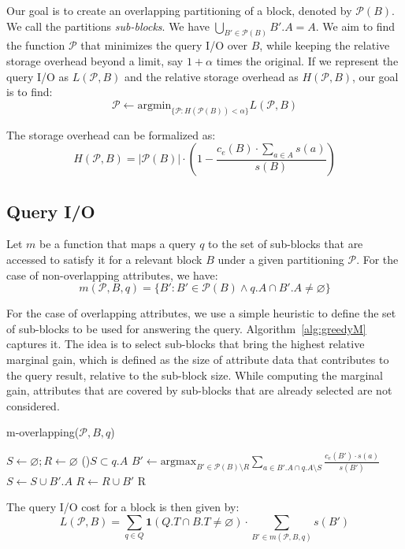 \documentclass[twocolumn]{svjour3}          %
\let\emptyset\varnothing
\begin{document}
Our goal is to create an overlapping partitioning of a block, denoted by
$\mathcal{P}(B)$. We call the partitions \emph{sub-blocks}. We have
$\bigcup_{B'\in \mathcal{P}(B)} B'.A = A$. We aim to find the function
$\mathcal{P}$ that minimizes the query I/O over $B$, while keeping the
relative storage overhead beyond a limit, say $1+\alpha$ times the original.
If we represent the query I/O as $L(\mathcal{P}, B)$ and the relative storage
overhead as $H(\mathcal{P}, B)$, our goal is to find:
\begin{equation}
\mathcal{P} \leftarrow \mbox{argmin}_{\{\mathcal{P}: H(\mathcal{P}(B)) < \alpha\}} L(\mathcal{P},B)
\end{equation}

The storage overhead can be formalized as:
\begin{equation}
H(\mathcal{P}, B) = |\mathcal{P}(B)|\cdot\left(1-\frac{c_e(B)\cdot \sum_{a\in A} s(a)}{s(B)}\right) 
\end{equation}

\subsection{Query I/O}

Let $m$ be a function that maps a query $q$ to the set of sub-blocks that are
accessed to satisfy it for a relevant block $B$ under a given partitioning
$\mathcal{P}$. For the case of non-overlapping attributes, we have:
\begin{equation}
m(\mathcal{P}, B, q) = \{B': B'\in \mathcal{P}(B) \wedge q.A \cap B'.A \ne \emptyset\}  
\end{equation}

For the case of overlapping attributes, we use a simple heuristic to define the
set of sub-blocks to be used for answering the query.
Algorithm~\ref{alg:greedyM} captures it. The idea is to select sub-blocks that
bring the highest relative marginal gain, which is defined as the size of
attribute data that contributes to the query result, relative to the sub-block
size. While computing the marginal gain, attributes that are covered by
sub-blocks that are already selected are not considered.
%
\begin{algorithm}[h]
\scriptsize
\caption{m-overlapping($\mathcal{P}, B, q$)}
\label{alg:greedyM}
$S\leftarrow \emptyset; R\leftarrow \emptyset$ 
\While(){$S \subset q.A$}{
  $B' \leftarrow \mbox{argmax}_{B'\in\mathcal{P}(B)\setminus R} \sum_{a\in B'.A \cap q.A \setminus S} \frac{c_e(B') \cdot s(a)}{s(B')}$
  $S \leftarrow S \cup B'.A$
  $R\leftarrow R \cup B'$
}
\Return R 
\end{algorithm} 
%
The query I/O cost for a block is then given by:
\begin{equation}
L(\mathcal{P}, B) = \sum_{q\in Q} \mathbf{1}(Q.T \cap B.T \neq \emptyset) \cdot \sum_{B'\in m(\mathcal{P}, B, q)} s(B')
\end{equation}
\end{document}
